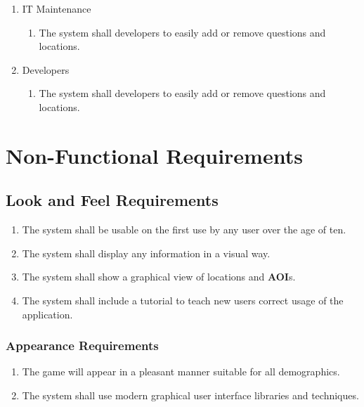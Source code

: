 \documentclass[titlepage]{article}
\newcounter{req}
\begin{document}
\begin{enumerate}[{BE1}]
\begin{enumerate}[{VP5.1}]
				\item IT Maintenance
				\begin{enumerate}
					\item The system shall developers to easily add or remove questions and locations.
				\end{enumerate}
				
				\item Developers
				\begin{enumerate}
					\item The system shall developers to easily add or remove questions and locations.
				\end{enumerate}
			\end{enumerate}
			
		\end{enumerate}
		
		\section{Non-Functional Requirements}
		\label{sec:non-functional_requirements}
		
		
		\subsection{Look and Feel Requirements}
		\setcounter{req}{0}
		\label{sub:look_and_feel_requirements}
		\begin{enumerate}[{LF}1. ]
		\setcounter{enumi}{\value{req}}
			\item
			The system shall be usable on the first use by any user over the age of ten.
			\item
			The system shall display any information in a visual way. %
			\item
			The system shall show a graphical view of locations and \textbf{AOI}s.
			\item
			The system shall include a tutorial to teach new users correct usage of the application.
		\setcounter{req}{\theenumi}
		\end{enumerate}
		
		\subsubsection{Appearance Requirements}
		\label{ssub:appearance_requirements}
		\begin{enumerate}[{LF}1. ]
		\setcounter{enumi}{\value{req}}
			\item 
			The game will appear in a pleasant manner suitable for all demographics.
			\item
			The system shall use modern graphical user interface libraries and techniques.
		\setcounter{req}{\theenumi}
		\end{enumerate}
		
\end{document}
